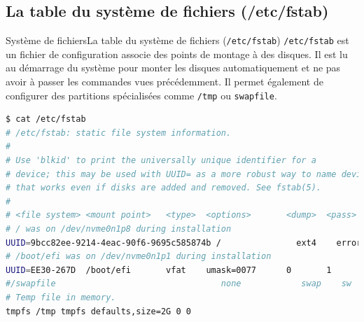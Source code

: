 \documentclass{beamer}
\begin{document}
    \subsection{La table du système de fichiers (/etc/fstab)}\label{subsec:fstab}
    \begin{frame}[fragile]{Système de fichiers}{La table du système de fichiers (\lstinline{/etc/fstab})}
        \lstinline{/etc/fstab} est un fichier de configuration associe des points de montage à des disques.
        Il est lu au démarrage du système pour monter les disques automatiquement et ne pas avoir à passer les commandes vues précédemment.
        \bigbreak
        Il permet également de configurer des partitions spécialisées comme \lstinline{/tmp} ou \lstinline{swapfile}.
        \begin{lstlisting}[language=bash,basicstyle=\tiny\ttfamily]
$ cat /etc/fstab
# /etc/fstab: static file system information.
#
# Use 'blkid' to print the universally unique identifier for a
# device; this may be used with UUID= as a more robust way to name devices
# that works even if disks are added and removed. See fstab(5).
#
# <file system> <mount point>   <type>  <options>       <dump>  <pass>
# / was on /dev/nvme0n1p8 during installation
UUID=9bcc82ee-9214-4eac-90f6-9695c585874b /               ext4    errors=remount-ro 0       1
# /boot/efi was on /dev/nvme0n1p1 during installation
UUID=EE30-267D  /boot/efi       vfat    umask=0077      0       1
#/swapfile                                 none            swap    sw              0       0
# Temp file in memory.
tmpfs /tmp tmpfs defaults,size=2G 0 0
        \end{lstlisting}
    \end{frame}
\end{document}
